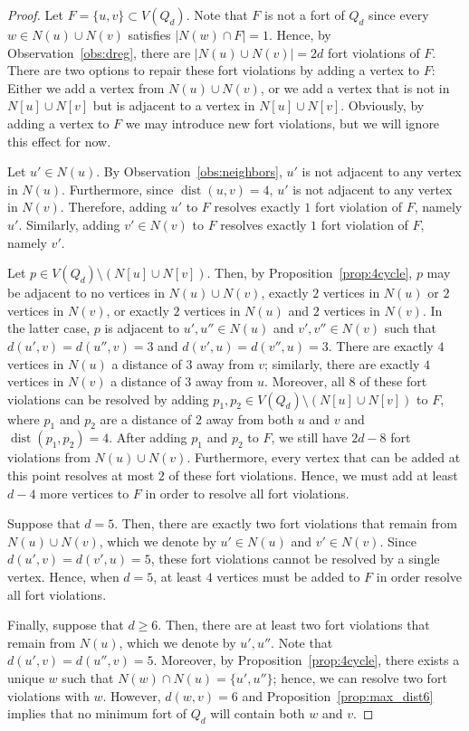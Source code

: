 \documentclass[twoside, 12pt]{article}
\theoremstyle{definition}
\newcommand\abs[1]{\left|#1\right|}
\newcommand\dist[2]{\operatorname{dist}\left(#1,#2\right)}
\begin{document}
\begin{proof}
Let $F=\{u,v\}\subset V(Q_{d})$.
Note that $F$ is not a fort of $Q_{d}$ since every $w\in N(u)\cup N(v)$ satisfies $\abs{N(w)\cap F}=1$. 
Hence, by Observation~\ref{obs:dreg}, there are $\abs{N(u)\cup N(v)}=2d$ fort violations of $F$.
There are two options to repair these fort violations by adding a vertex to $F$: Either we add a vertex from $N(u)\cup N(v)$, or we add a vertex that is not in $N[u]\cup N[v]$ but is adjacent to a vertex in $N[u]\cup N[v]$.
Obviously, by adding a vertex to $F$ we may introduce new fort violations, but we will ignore this effect for now.

Let $u'\in N(u)$.
By Observation~\ref{obs:neighbors}, $u'$ is not adjacent to any vertex in $N(u)$.
Furthermore, since $\dist{u}{v}=4$, $u'$ is not adjacent to any vertex in $N(v)$. 
Therefore, adding $u'$ to $F$ resolves exactly $1$ fort violation of $F$, namely $u'$.
Similarly, adding $v'\in N(v)$ to $F$ resolves exactly $1$ fort violation of $F$, namely $v'$. 

Let $p\in V(Q_{d})\setminus\left(N[u]\cup N[v]\right)$.
Then, by Proposition~\ref{prop:4cycle}, $p$ may be adjacent to no vertices in $N(u)\cup N(v)$, exactly $2$ vertices in $N(u)$ or $2$ vertices in $N(v)$, or exactly $2$ vertices in $N(u)$ and $2$ vertices in $N(v)$. 
In the latter case, $p$ is adjacent to $u',u''\in N(u)$ and $v',v''\in N(v)$ such that $d(u',v)=d(u'',v)=3$ and $d(v',u)=d(v'',u)=3$.
There are exactly $4$ vertices in $N(u)$ a distance of $3$ away from $v$; similarly, there are exactly $4$ vertices in $N(v)$ a distance of $3$ away from $u$.
Moreover, all $8$ of these fort violations can be resolved by adding $p_{1},p_{2}\in V(Q_{d})\setminus\left(N[u]\cup N[v]\right)$ to $F$, where $p_{1}$ and $p_{2}$ are a distance of $2$ away from both $u$ and $v$ and $\dist{p_{1}}{p_{2}}=4$.
After adding $p_{1}$ and $p_{2}$ to $F$, we still have $2d-8$ fort violations from $N(u)\cup N(v)$.
Furthermore, every vertex that can be added at this point resolves at most $2$ of these fort violations.
Hence, we must add at least $d-4$ more vertices to $F$ in order to resolve all fort violations.

Suppose that $d=5$.
Then, there are exactly two fort violations that remain from $N(u)\cup N(v)$, which we denote by $u'\in N(u)$ and $v'\in N(v)$.
Since $d(u',v)=d(v',u)=5$, these fort violations cannot be resolved by a single vertex. 
Hence, when $d=5$, at least $4$ vertices must be added to $F$ in order resolve all fort violations. 

Finally, suppose that $d\geq 6$. 
Then, there are at least two fort violations that remain from $N(u)$, which we denote by $u',u''$.
Note that $d(u',v)=d(u'',v)=5$. 
Moreover, by Proposition~\ref{prop:4cycle}, there exists a unique $w$ such that $N(w)\cap N(u)=\{u',u''\}$; hence, we can resolve two fort violations with $w$.
However, $d(w,v)=6$ and Proposition~\ref{prop:max_dist6} implies that no minimum fort of $Q_{d}$ will contain both $w$ and $v$.
\end{proof}
\end{document}
